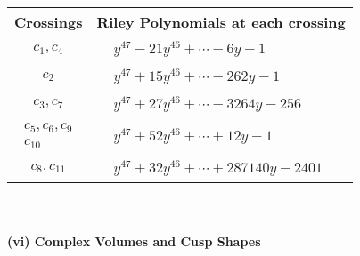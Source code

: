 \documentclass[1p]{elsarticle_modified}
\theoremstyle{definition}
\begin{document}
\begin{tabular}{m{50pt}|m{274pt}}
Crossings & \hspace{64pt}Riley Polynomials at each crossing \\
\hline $$\begin{aligned}c_{1},c_{4}\end{aligned}$$&$\begin{aligned}
&y^{47}-21 y^{46}+\cdots-6 y-1
\end{aligned}$\\
\hline $$\begin{aligned}c_{2}\end{aligned}$$&$\begin{aligned}
&y^{47}+15 y^{46}+\cdots-262 y-1
\end{aligned}$\\
\hline $$\begin{aligned}c_{3},c_{7}\end{aligned}$$&$\begin{aligned}
&y^{47}+27 y^{46}+\cdots-3264 y-256
\end{aligned}$\\
\hline $$\begin{aligned}c_{5},c_{6},c_{9}\\c_{10}\end{aligned}$$&$\begin{aligned}
&y^{47}+52 y^{46}+\cdots+12 y-1
\end{aligned}$\\
\hline $$\begin{aligned}c_{8},c_{11}\end{aligned}$$&$\begin{aligned}
&y^{47}+32 y^{46}+\cdots+287140 y-2401
\end{aligned}$\\
\hline
\end{tabular}\\~\\
\newpage\flushleft \textbf{(vi) Complex Volumes and Cusp Shapes}
\end{document}
